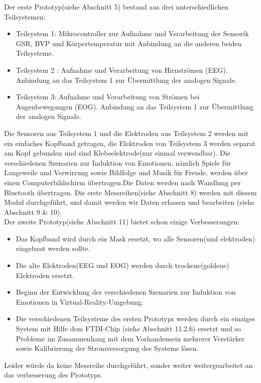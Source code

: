 Der erste Prototyp(siehe Abschnitt 5) bestand aus drei unterschiedlichen
Teilsystemen:
\begin{itemize} \setlength\itemsep{-0.15cm}
\item Teilsystem 1: Mikrocontroller zur Aufnahme und Verarbeitung der Sensorik GSR, BVP und Körpertemperatur mit Anbindung an die anderen beiden Teilsysteme. 
\item Teilsystem 2 : Aufnahme und Verarbeitung von Hirnströmen (EEG). Anbindung an das Teilsystem 1 zur Übermittlung der analogen Signale. 
\item Teilsystem 3: Aufnahme und Verarbeitung von Strömen bei Augenbewegungen (EOG). Anbindung an das Teilsystem 1 zur Übermittlung der analogen Signale. 
\end{itemize}

Die Sensoren aus Teilsystem 1 und die Elektroden aus Teilsystem 2 werden mit ein einfaches Kopfband getragen, die Elektroden von Teilsystem 3 werden separat am Kopf gebunden und sind  Klebeelektrode(nur einmal verwendbar). 
Die verschiedenen Szenarien zur Induktion von Emotionen, nämlich Spiele für Langeweile und Verwirrung sowie Bildfolge und Musik für Freude, werden über einen Computerbildschirm übertragen.Die Daten werden nach Wandlung per Bluetooth übertragen. 
Die erste Messreihen(siehe Abschnitt 8) werden mit diesem Modul durchgeführt, und damit werden wir  Daten erfassen und bearbeiten (siehe Abschnitt 9 \& 10). \\

Der zweite Prototyp(siehe Abschnitt 11) bietet schon einige Verbesserungen: 
\begin{itemize} \setlength\itemsep{-0.15cm}
\item Das Kopfband wird durch ein Mask ersetzt, wo alle Sensoren(und  elektroden) eingebaut werden sollte. 
\item Die alte Elektroden(EEG und EOG) werden durch trockene(goldene) Elektroden ersetzt. 
\item Beginn der Entwicklung der verschiedenen Szenarien zur Induktion von Emotionen in Virtual-Reality-Umgebung.  
\item Die verschiedenen Teilsysteme des ersten Prototyps werden durch ein einziges System mit Hilfe dem FTDI-Chip (siehe Abschnitt 11.2.6) ersetzt und so Probleme im Zusammenhang mit dem Vorhandensein mehrerer Verstärker sowie Kalibrierung der Stromversorgung des Systems lösen. 
\end{itemize}

Leider würde da keine Messreihe durchgeführt, sonder weiter weitergearbeitet an das verbesserung des Prototyps. \\


